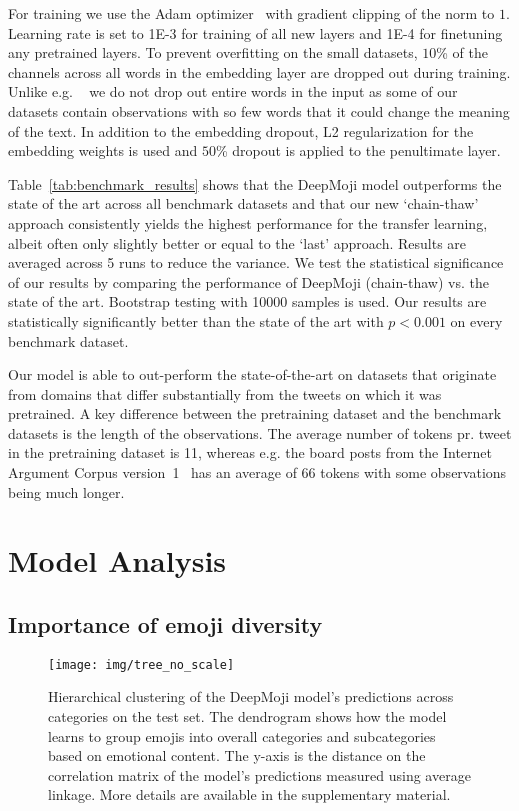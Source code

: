 \documentclass[11pt,a4paper]{article}
\begin{document}
For training we use the Adam optimizer~\cite{kingma2014adam} with gradient clipping of the norm to $1$. Learning rate is set to \num{1E-3} for training of all new layers and \num{1E-4} for finetuning any pretrained layers. To prevent overfitting on the small datasets, $10$\% of the channels across all words in the embedding layer are dropped out during training. Unlike e.g. ~\cite{gal2016theoretically} we do not drop out entire words in the input as some of our datasets contain observations with so few words that it could change the meaning of the text. In addition to the embedding dropout, L2 regularization for the embedding weights is used and $50$\% dropout is applied to the penultimate layer.

Table~\ref{tab:benchmark_results} shows that the DeepMoji model outperforms the state of the art across all benchmark datasets and that our new `chain-thaw' approach consistently yields the highest performance for the transfer learning, albeit often only slightly better or equal to the `last' approach. Results are averaged across 5 runs to reduce the variance. We test the statistical significance of our results by comparing the performance of DeepMoji (chain-thaw) vs. the state of the art. Bootstrap testing with 10000 samples is used. Our results are statistically significantly better than the state of the art with $p < 0.001$ on every benchmark dataset.

Our model is able to out-perform the state-of-the-art on datasets that originate from domains that differ substantially from the tweets on which it was pretrained. A key difference between the pretraining dataset and the benchmark datasets is the length of the observations. The average number of tokens pr. tweet in the pretraining dataset is 11, whereas e.g. the board posts from the Internet Argument Corpus version~1~\cite{oraby2016creating} has an average of 66 tokens with some observations being much longer. 

\section{Model Analysis}
\label{sec:analysis}


\subsection{Importance of emoji diversity}
\label{sub_sec:emoji_diversity}



\begin{figure*}[tp]
  \centering
  \texttt{[image: img/tree\_no\_scale]} \caption{Hierarchical clustering of the DeepMoji model's predictions across categories on the test set. The dendrogram shows how the model learns to group emojis into overall categories and subcategories based on emotional content. The y-axis is the distance on the correlation matrix of the model's predictions measured using average linkage. More details are available in the supplementary material.}
  \label{fig:tree}
\end{figure*}
\end{document}

